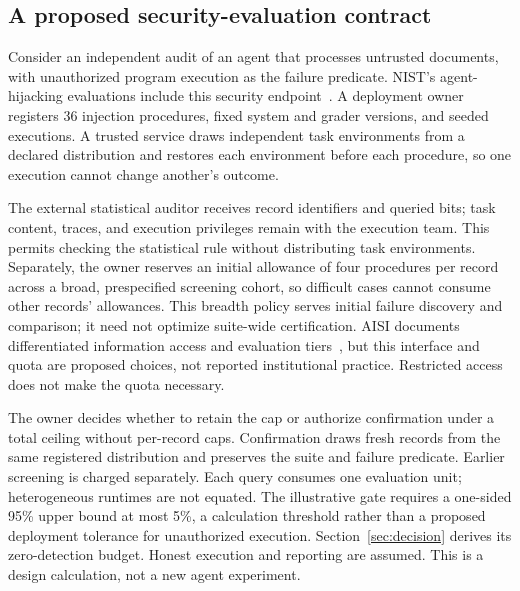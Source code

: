 \documentclass[conference]{IEEEtran}
\begin{document}
\subsection{A proposed security-evaluation contract}\label{sec:contract}
Consider an independent audit of an agent that processes untrusted documents, with unauthorized program execution as the failure predicate. NIST's agent-hijacking evaluations include this security endpoint~\cite{nistagent}. A deployment owner registers 36 injection procedures, fixed system and grader versions, and seeded executions. A trusted service draws independent task environments from a declared distribution and restores each environment before each procedure, so one execution cannot change another's outcome.

The external statistical auditor receives record identifiers and queried bits; task content, traces, and execution privileges remain with the execution team. This permits checking the statistical rule without distributing task environments. Separately, the owner reserves an initial allowance of four procedures per record across a broad, prespecified screening cohort, so difficult cases cannot consume other records' allowances. This breadth policy serves initial failure discovery and comparison; it need not optimize suite-wide certification. AISI documents differentiated information access and evaluation tiers~\cite{aisievaluation}, but this interface and quota are proposed choices, not reported institutional practice. Restricted access does not make the quota necessary.

The owner decides whether to retain the cap or authorize confirmation under a total ceiling without per-record caps. Confirmation draws fresh records from the same registered distribution and preserves the suite and failure predicate. Earlier screening is charged separately. Each query consumes one evaluation unit; heterogeneous runtimes are not equated. The illustrative gate requires a one-sided 95\% upper bound at most 5\%, a calculation threshold rather than a proposed deployment tolerance for unauthorized execution. Section~\ref{sec:decision} derives its zero-detection budget. Honest execution and reporting are assumed. This is a design calculation, not a new agent experiment.
\end{document}
